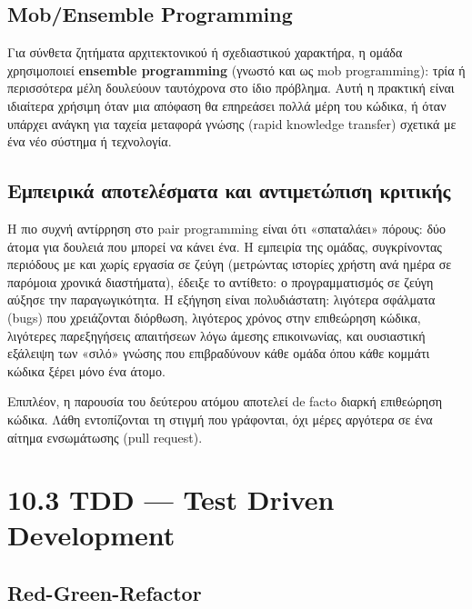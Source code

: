 \documentclass[11pt,a4paper,greek,twoside]{template-xe}
\begin{document}
\subsection{Mob/Ensemble Programming}\label{mobensemble-programming}

Για σύνθετα ζητήματα αρχιτεκτονικού ή σχεδιαστικού χαρακτήρα, η ομάδα
χρησιμοποιεί \textbf{ensemble programming} (γνωστό και ως mob
programming): τρία ή περισσότερα μέλη δουλεύουν ταυτόχρονα στο ίδιο
πρόβλημα. Αυτή η πρακτική είναι ιδιαίτερα χρήσιμη όταν μια απόφαση θα
επηρεάσει πολλά μέρη του κώδικα, ή όταν υπάρχει ανάγκη για ταχεία
μεταφορά γνώσης (rapid knowledge transfer) σχετικά με ένα νέο σύστημα ή
τεχνολογία.

\subsection{Εμπειρικά αποτελέσματα και αντιμετώπιση
κριτικής}\label{ux3b5ux3bcux3c0ux3b5ux3b9ux3c1ux3b9ux3baux3ac-ux3b1ux3c0ux3bfux3c4ux3b5ux3bbux3adux3c3ux3bcux3b1ux3c4ux3b1-ux3baux3b1ux3b9-ux3b1ux3bdux3c4ux3b9ux3bcux3b5ux3c4ux3ceux3c0ux3b9ux3c3ux3b7-ux3baux3c1ux3b9ux3c4ux3b9ux3baux3aeux3c2}

Η πιο συχνή αντίρρηση στο pair programming είναι ότι «σπαταλάει» πόρους:
δύο άτομα για δουλειά που μπορεί να κάνει ένα. Η εμπειρία της ομάδας,
συγκρίνοντας περιόδους με και χωρίς εργασία σε ζεύγη (μετρώντας ιστορίες
χρήστη ανά ημέρα σε παρόμοια χρονικά διαστήματα), έδειξε το αντίθετο: ο
προγραμματισμός σε ζεύγη αύξησε την παραγωγικότητα. Η εξήγηση είναι
πολυδιάστατη: λιγότερα σφάλματα (bugs) που χρειάζονται διόρθωση,
λιγότερος χρόνος στην επιθεώρηση κώδικα, λιγότερες παρεξηγήσεις
απαιτήσεων λόγω άμεσης επικοινωνίας, και ουσιαστική εξάλειψη των «σιλό»
γνώσης που επιβραδύνουν κάθε ομάδα όπου κάθε κομμάτι κώδικα ξέρει μόνο
ένα άτομο.

Επιπλέον, η παρουσία του δεύτερου ατόμου αποτελεί de facto διαρκή
επιθεώρηση κώδικα. Λάθη εντοπίζονται τη στιγμή που γράφονται, όχι μέρες
αργότερα σε ένα αίτημα ενσωμάτωσης (pull request).

\section{10.3 TDD --- Test Driven
Development}\label{tdd-test-driven-development}

\subsection{Red-Green-Refactor}\label{red-green-refactor}
\end{document}

